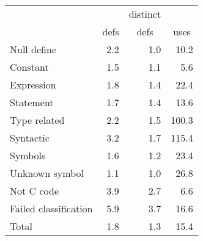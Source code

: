\begin{tabular}{|l|r|r|r|} \hline
 & & \multicolumn{1}{c|}{distinct} & \\
 & \multicolumn{1}{c|}{defs} & \multicolumn{1}{c|}{defs} & \multicolumn{1}{c|}{uses} \\ \hline
Null define & 2.2 & 1.0 & 10.2 \\
Constant & 1.5 & 1.1 & 5.6 \\
Expression & 1.8 & 1.4 & 22.4 \\
Statement & 1.7 & 1.4 & 13.6 \\
Type related & 2.2 & 1.5 & 100.3 \\
Syntactic & 3.2 & 1.7 & 115.4 \\
Symbols & 1.6 & 1.2 & 23.4 \\
Unknown symbol & 1.1 & 1.0 & 26.8 \\
Not C code & 3.9 & 2.7 & 6.6 \\
Failed classification & 5.9 & 3.7 & 16.6 \\ \hline
Total & 1.8 & 1.3 & 15.4 \\ \hline
\end{tabular}

